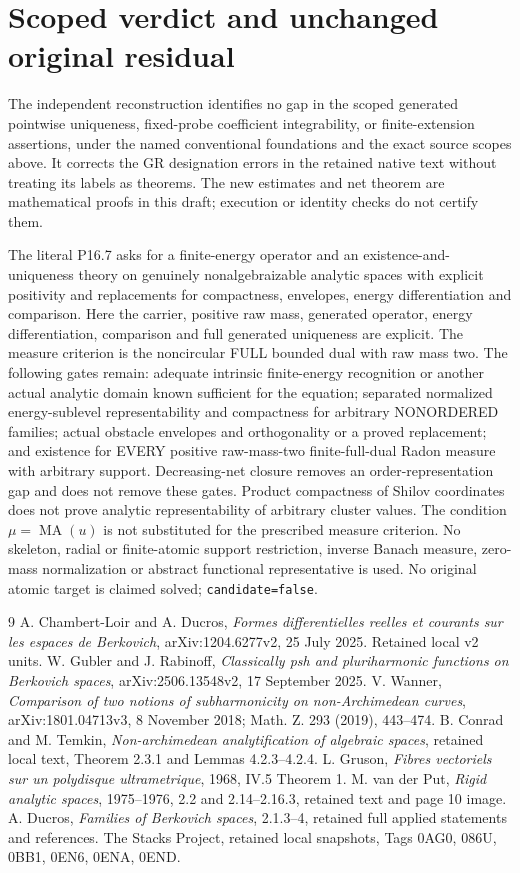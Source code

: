 \documentclass[11pt]{article}
\newcommand{\MA}{\operatorname{MA}}
\theoremstyle{remark}\newtheorem{remark}[theorem]{Remark}
\begin{document}
\section{Scoped verdict and unchanged original residual}
The independent reconstruction identifies no gap in the scoped
generated pointwise uniqueness, fixed-probe coefficient integrability,
or finite-extension assertions, under the named conventional
foundations and the exact source scopes above. It corrects the GR
designation errors in the retained native text without treating its
labels as theorems. The new estimates and net theorem are mathematical
proofs in this draft; execution or identity checks do not certify them.

The literal P16.7 asks for a finite-energy operator and an
existence-and-uniqueness theory on genuinely nonalgebraizable analytic
spaces with explicit positivity and replacements for compactness,
envelopes, energy differentiation and comparison. Here the carrier,
positive raw mass, generated operator, energy differentiation,
comparison and full generated uniqueness are explicit. The measure
criterion is the noncircular FULL bounded dual with raw mass two.
The following gates remain: adequate intrinsic finite-energy recognition
or another actual analytic domain known sufficient for the equation;
separated normalized energy-sublevel representability and compactness
for arbitrary NONORDERED families; actual obstacle envelopes and
orthogonality or a proved replacement; and existence for EVERY positive
raw-mass-two finite-full-dual Radon measure with arbitrary support.
Decreasing-net closure removes an order-representation gap and does
not remove these gates. Product compactness of Shilov coordinates does
not prove analytic representability of arbitrary cluster values.
The condition $\mu=\MA(u)$ is not substituted for the prescribed
measure criterion. No skeleton, radial or finite-atomic support restriction,
inverse Banach measure, zero-mass normalization or abstract functional
representative is used. No original atomic target is claimed solved;
\texttt{candidate=false}.

\begin{thebibliography}{9}
 A. Chambert-Loir and A. Ducros,
\emph{Formes differentielles reelles et courants sur les espaces de
Berkovich}, arXiv:1204.6277v2, 25 July 2025. Retained local v2 units.
 W. Gubler and J. Rabinoff,
\emph{Classically psh and pluriharmonic functions on Berkovich spaces},
arXiv:2506.13548v2, 17 September 2025.
 V. Wanner, \emph{Comparison of two notions of subharmonicity
on non-Archimedean curves}, arXiv:1801.04713v3, 8 November 2018;
Math. Z. 293 (2019), 443--474.
 B. Conrad and M. Temkin,
\emph{Non-archimedean analytification of algebraic spaces}, retained
local text, Theorem 2.3.1 and Lemmas 4.2.3--4.2.4.
 L. Gruson, \emph{Fibres vectoriels sur un polydisque
ultrametrique}, 1968, IV.5 Theorem 1.
 M. van der Put, \emph{Rigid analytic spaces}, 1975--1976,
2.2 and 2.14--2.16.3, retained text and page 10 image.
 A. Ducros, \emph{Families of Berkovich spaces}, 2.1.3--4,
retained full applied statements and references.
 The Stacks Project, retained local snapshots,
Tags 0AG0, 086U, 0BB1, 0EN6, 0ENA, 0END.
\end{thebibliography}
\end{document}
